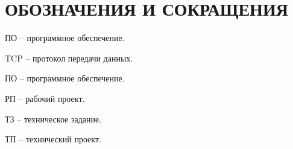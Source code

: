 \newsection
\section*{ОБОЗНАЧЕНИЯ И СОКРАЩЕНИЯ}

ПО -- программное обеспечение.

TCP -- протокол передачи данных.

ПО -- программное обеспечение.

РП -- рабочий проект.

ТЗ -- техническое задание.

ТП -- технический проект.

